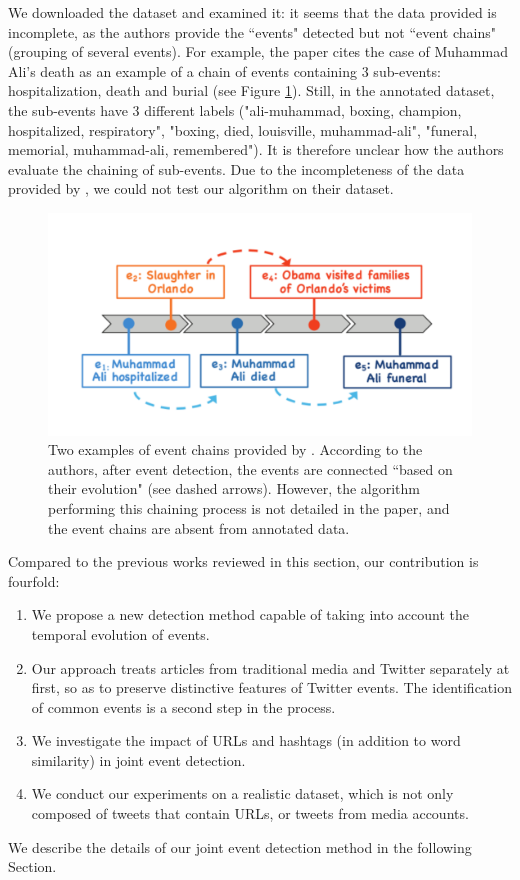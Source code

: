 We downloaded the dataset and examined it: it seems that the data provided is incomplete, as the authors provide the 
``events" detected but not 
``event chains" (grouping of several events). For example, the paper \citep{mele2019event}  cites the case of Muhammad Ali's death as an example of a chain of events containing 3 sub-events: hospitalization, death and burial (see Figure \ref{fig:mele-muhammad}). Still, in the annotated dataset, the sub-events have 3 different labels ("ali-muhammad, boxing, champion, hospitalized, respiratory", "boxing, died, louisville, muhammad-ali", "funeral, memorial, muhammad-ali, remembered"). It is therefore unclear how the authors evaluate the chaining of sub-events. Due to the incompleteness of the data provided by \citet{mele2019event}, we could not test our algorithm on their dataset.
\begin{figure}
    \centering
    \includegraphics[width=.6\textwidth]{figures/Mele_Muhammad_Ali.png}
    \caption[Two examples of event chains provided by \cite{mele2019event}]{Two examples of event chains provided by \cite{mele2019event}. According to the authors, after event detection, the events are connected ``based on their evolution" (see dashed arrows). However, the algorithm performing this chaining process is not detailed in the paper, and the event chains are absent from annotated data.}
    \label{fig:mele-muhammad}
\end{figure}

Compared to the previous works reviewed in this section, our contribution is fourfold:
\begin{enumerate}
    \item We propose a new detection method capable of taking into account the temporal evolution of events.
    \item Our approach treats articles from traditional media and Twitter separately at first, so as to preserve distinctive features of Twitter events. The identification of common events is a second step in the process.
    \item We investigate the impact of URLs and hashtags (in addition to word similarity) in joint event detection.
    \item We conduct our experiments on a realistic dataset, which is not only composed of tweets that contain URLs, or tweets from media accounts.
\end{enumerate}
We describe the details of our joint event detection method in the following Section.
